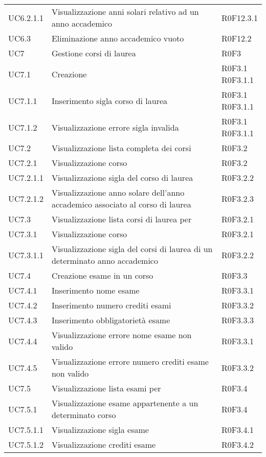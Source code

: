 \documentclass[AnalisiDeiRequisiti.tex]{subfiles}
\begin{document}
\begin{longtable}[H]{p{2cm}p{5cm}p{5cm}}
	UC6.2.1.1 & Visualizzazione anni solari relativo ad un anno accademico & R0F12.3.1 \\
	UC6.3 & Eliminazione anno accademico vuoto & R0F12.2 \\
	UC7 & Gestione corsi di laurea & R0F3 \\
	UC7.1 & Creazione \citGloss{corso di laurea} & \makecell[tl]{
		R0F3.1\\
		R0F3.1.1 } \\
	UC7.1.1 & Inserimento sigla corso di laurea & \makecell[tl]{
		R0F3.1\\
		R0F3.1.1 } \\
	UC7.1.2 & Visualizzazione errore sigla invalida & \makecell[tl]{
		R0F3.1\\
		R0F3.1.1 } \\
	UC7.2 & Visualizzazione lista completa dei corsi & R0F3.2 \\
	UC7.2.1 & Visualizzazione corso & R0F3.2 \\
	UC7.2.1.1 & Visualizzazione sigla del corso di laurea & R0F3.2.2 \\
	UC7.2.1.2 & Visualizzazione anno solare dell'anno accademico associato al corso di laurea & R0F3.2.3 \\
	UC7.3 & Visualizzazione lista corsi di laurea per \citGloss{anno accademico} & R0F3.2.1  \\
	UC7.3.1 & Visualizzazione corso & R0F3.2.1\\
	UC7.3.1.1 & Visualizzazione sigla del corsi di laurea di un determinato anno accademico & R0F3.2.2  \\
	UC7.4 & Creazione esame in un corso & R0F3.3\\
	UC7.4.1 & Inserimento nome esame & R0F3.3.1\\
	UC7.4.2 & Inserimento numero crediti esami & R0F3.3.2\\
	UC7.4.3 & Inserimento obbligatorietà esame & R0F3.3.3\\
	UC7.4.4 & Visualizzazione errore nome esame non valido & R0F3.3.1\\
	UC7.4.5 & Visualizzazione errore numero crediti esame non valido & R0F3.3.2\\
	UC7.5 & Visualizzazione lista esami per \citGloss{corso di laurea} & R0F3.4 \\
	UC7.5.1 & Visualizzazione esame appartenente a un determinato corso & R0F3.4 \\
	UC7.5.1.1 & Visualizzazione sigla esame & R0F3.4.1 \\
	UC7.5.1.2 & Visualizzazione crediti esame & R0F3.4.2 \\

\end{longtable}
\end{document}
